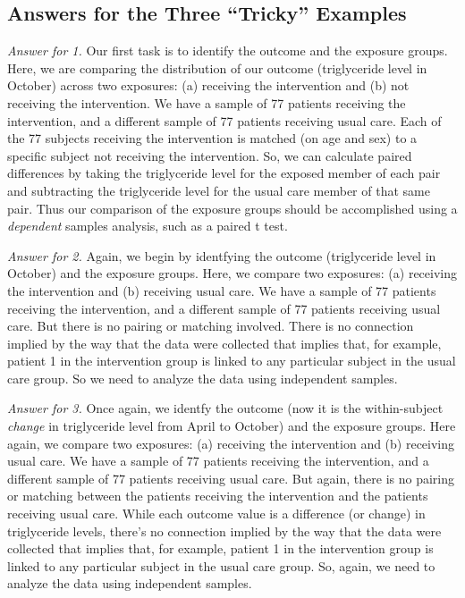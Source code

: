 \documentclass[
]{book}
\begin{document}
\hypertarget{answers-for-the-three-tricky-examples}{%
\subsection{Answers for the Three ``Tricky'' Examples}\label{answers-for-the-three-tricky-examples}}

\emph{Answer for 1.} Our first task is to identify the outcome and the exposure groups. Here, we are comparing the distribution of our outcome (triglyceride level in October) across two exposures: (a) receiving the intervention and (b) not receiving the intervention. We have a sample of 77 patients receiving the intervention, and a different sample of 77 patients receiving usual care. Each of the 77 subjects receiving the intervention is matched (on age and sex) to a specific subject not receiving the intervention. So, we can calculate paired differences by taking the triglyceride level for the exposed member of each pair and subtracting the triglyceride level for the usual care member of that same pair. Thus our comparison of the exposure groups should be accomplished using a \emph{dependent} samples analysis, such as a paired t test.

\emph{Answer for 2.} Again, we begin by identfying the outcome (triglyceride level in October) and the exposure groups. Here, we compare two exposures: (a) receiving the intervention and (b) receiving usual care. We have a sample of 77 patients receiving the intervention, and a different sample of 77 patients receiving usual care. But there is no pairing or matching involved. There is no connection implied by the way that the data were collected that implies that, for example, patient 1 in the intervention group is linked to any particular subject in the usual care group. So we need to analyze the data using independent samples.

\emph{Answer for 3.} Once again, we identfy the outcome (now it is the within-subject \emph{change} in triglyceride level from April to October) and the exposure groups. Here again, we compare two exposures: (a) receiving the intervention and (b) receiving usual care. We have a sample of 77 patients receiving the intervention, and a different sample of 77 patients receiving usual care. But again, there is no pairing or matching between the patients receiving the intervention and the patients receiving usual care. While each outcome value is a difference (or change) in triglyceride levels, there's no connection implied by the way that the data were collected that implies that, for example, patient 1 in the intervention group is linked to any particular subject in the usual care group. So, again, we need to analyze the data using independent samples.
\end{document}
